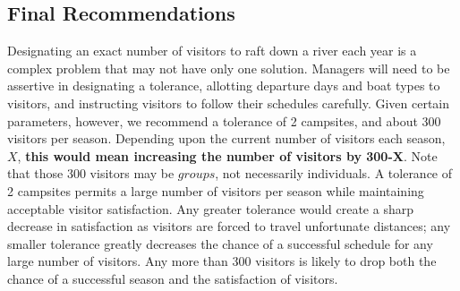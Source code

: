 \documentclass[11pt]{article} %
\begin{document}
\subsection{Final Recommendations}
\label{sec:final}
Designating an exact number of visitors to raft down a river each year is
a complex problem that may not have only one solution. Managers will need
to be assertive in designating a tolerance, allotting departure days and
boat types to visitors, and instructing visitors to follow their schedules
carefully. Given certain parameters, however, we recommend a tolerance of
2 campsites, and about 300 visitors per season. Depending upon the current
number of visitors each season, $X$, \textbf{this would mean increasing the number
of visitors by 300-X}.  Note that those 300 visitors may be $groups$, not
necessarily individuals.  A tolerance of 2 campsites
permits a large number of visitors per season while maintaining acceptable
visitor satisfaction. Any greater tolerance would create a sharp decrease
in satisfaction as visitors are forced to travel unfortunate distances; any
smaller tolerance greatly decreases the chance of a successful schedule for
any large number of visitors. Any more than 300 visitors is likely to drop
both the chance of a successful season and the satisfaction of visitors.


\newpage




\end{document}
